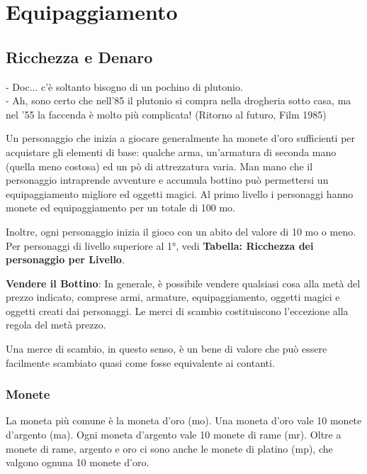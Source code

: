 \documentclass[a4paper,11pt,twoside,openany]{book}
\begin{document}
\section{Equipaggiamento}

\label{equipaggiamento}

\subsection{Ricchezza e Denaro}


\begin{tcolorbox}[enhanced,arc=5pt,boxrule=0.3pt]{
- Doc... c'è soltanto bisogno di un pochino di plutonio.\\
- Ah, sono certo che nell'85 il plutonio si compra nella drogheria sotto casa, ma nel '55 la faccenda è molto più complicata! (Ritorno al futuro, Film 1985)}\end{tcolorbox}\medskip


\label{ricchezza-e-denaro}

Un personaggio che inizia a giocare generalmente ha monete d'oro sufficienti per acquistare gli elementi di base: qualche arma, un'armatura di seconda mano (quella meno costosa) ed un pò di attrezzatura varia. Man mano che il personaggio intraprende avventure e accumula bottino può permettersi un equipaggiamento migliore ed oggetti magici. Al primo livello i personaggi hanno monete ed equipaggiamento per un totale di 100 mo.

Inoltre, ogni personaggio inizia il gioco con un abito del valore di 10 mo o meno. Per personaggi di livello superiore al 1°, vedi \textbf{Tabella: Ricchezza dei personaggio per Livello}.

\medskip

\textbf{Vendere il Bottino}: In generale, è possibile vendere qualsiasi cosa alla metà del prezzo indicato, comprese armi, armature, equipaggiamento, oggetti magici e oggetti creati dai personaggi. Le merci di scambio costituiscono l'eccezione alla regola del metà prezzo.

Una merce di scambio, in questo senso, è un bene di valore che può essere facilmente scambiato quasi come fosse equivalente ai contanti.

\subsubsection{Monete}

La moneta più comune è la moneta d'oro (mo). Una moneta d'oro vale 10 monete d'argento (ma). Ogni moneta d'argento vale 10 monete di rame (mr). Oltre a monete di rame, argento e oro ci sono anche le monete di platino (mp), che valgono ognuna 10 monete d'oro.
\end{document}
